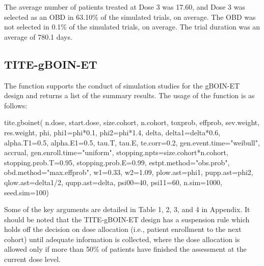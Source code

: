 The average number of patients treated at Dose 3 was 17.60, and Dose 3 was selected as an OBD in 63.10\% of the simulated trials, on average. The OBD was not selected in 0.1\% of the simulated trials, on average. The trial duration was an average of 780.1 days.

\subsection{TITE-gBOIN-ET}
The  function supports the conduct of simulation studies for the gBOIN-ET design and returns a list of the summary results. The usage of the  function is as follows:
\begin{example}
tite.gboinet(
  n.dose, start.dose, size.cohort, n.cohort,
  toxprob, effprob, sev.weight, res.weight,
  phi, phi1=phi*0.1, phi2=phi*1.4, delta, delta1=delta*0.6,
  alpha.T1=0.5, alpha.E1=0.5, tau.T, tau.E,
  te.corr=0.2, gen.event.time="weibull",
  accrual, gen.enroll.time="uniform",
  stopping.npts=size.cohort*n.cohort,
  stopping.prob.T=0.95, stopping.prob.E=0.99,
  estpt.method="obs.prob", obd.method="max.effprob",
  w1=0.33, w2=1.09,
  plow.ast=phi1, pupp.ast=phi2, qlow.ast=delta1/2, qupp.ast=delta,
  psi00=40, psi11=60,
  n.sim=1000, seed.sim=100)
\end{example}
Some of the key arguments are detailed in Table 1, 2, 3, and 4 in Appendix. It should be noted that the TITE-gBOIN-ET design has a suspension rule which holds off the decision on dose allocation (i.e., patient enrollment to the next cohort) until adequate information is collected, where the dose allocation is allowed only if more than 50\% of patients have finished the assessment at the current dose level.

